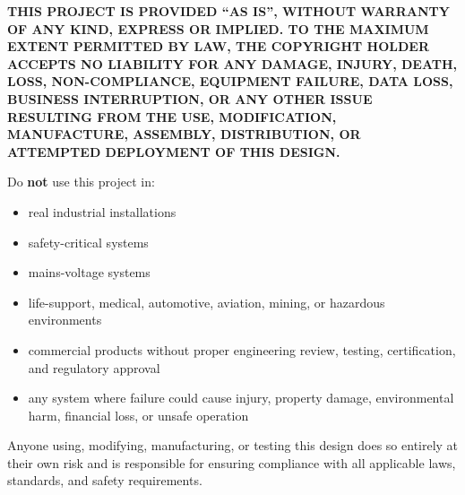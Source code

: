 \documentclass[10pt]{datasheet}
\begin{document}
\vspace{0.5em}

\noindent\textbf{THIS PROJECT IS PROVIDED ``AS IS'', WITHOUT WARRANTY OF ANY KIND, EXPRESS OR IMPLIED. TO THE MAXIMUM EXTENT PERMITTED BY LAW, THE COPYRIGHT HOLDER ACCEPTS NO LIABILITY FOR ANY DAMAGE, INJURY, DEATH, LOSS, NON-COMPLIANCE, EQUIPMENT FAILURE, DATA LOSS, BUSINESS INTERRUPTION, OR ANY OTHER ISSUE RESULTING FROM THE USE, MODIFICATION, MANUFACTURE, ASSEMBLY, DISTRIBUTION, OR ATTEMPTED DEPLOYMENT OF THIS DESIGN.}

\vspace{1em}

\noindent Do \textbf{not} use this project in:

\begin{itemize}[leftmargin=*, itemsep=2pt, topsep=4pt]
    \item real industrial installations
    \item safety-critical systems
    \item mains-voltage systems
    \item life-support, medical, automotive, aviation, mining, or hazardous environments
    \item commercial products without proper engineering review, testing, certification, and regulatory approval
    \item any system where failure could cause injury, property damage, environmental harm, financial loss, or unsafe operation
\end{itemize}

Anyone using, modifying, manufacturing, or testing this design does so entirely at their own risk and is responsible for ensuring compliance with all applicable laws, standards, and safety requirements.
\end{document}

